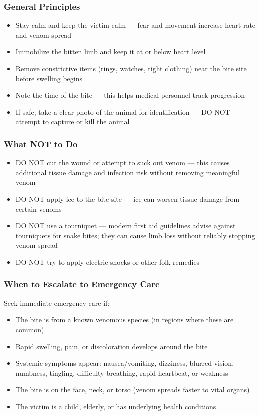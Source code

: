 \subsubsection{General Principles}

\begin{itemize}[leftmargin=*]
  \item Stay calm and keep the victim calm — fear and movement increase heart rate and venom spread
  \item Immobilize the bitten limb and keep it at or below heart level
  \item Remove constrictive items (rings, watches, tight clothing) near the bite site before swelling begins
  \item Note the time of the bite — this helps medical personnel track progression
  \item If safe, take a clear photo of the animal for identification — DO NOT attempt to capture or kill the animal
\end{itemize}

\subsubsection{What NOT to Do}

\begin{itemize}[leftmargin=*]
  \item DO NOT cut the wound or attempt to suck out venom — this causes additional tissue damage and infection risk without removing meaningful venom
  \item DO NOT apply ice to the bite site — ice can worsen tissue damage from certain venoms
  \item DO NOT use a tourniquet — modern first aid guidelines advise against tourniquets for snake bites; they can cause limb loss without reliably stopping venom spread
  \item DO NOT try to apply electric shocks or other folk remedies
\end{itemize}

\subsubsection{When to Escalate to Emergency Care}

Seek immediate emergency care if:
\begin{itemize}[leftmargin=*]
  \item The bite is from a known venomous species (in regions where these are common)
  \item Rapid swelling, pain, or discoloration develops around the bite
  \item Systemic symptoms appear: nausea/vomiting, dizziness, blurred vision, numbness, tingling, difficulty breathing, rapid heartbeat, or weakness
  \item The bite is on the face, neck, or torso (venom spreads faster to vital organs)
  \item The victim is a child, elderly, or has underlying health conditions
\end{itemize}


